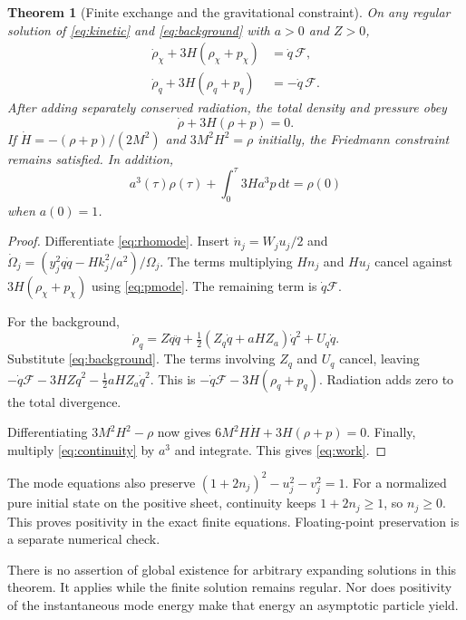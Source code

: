 \documentclass[11pt]{article}
\newtheorem{theorem}{Theorem}[section]\newtheorem{proposition}[theorem]{Proposition}\newtheorem{corollary}[theorem]{Corollary}
\theoremstyle{definition}\newtheorem{definition}[theorem]{Definition}
\newcommand{\dd}{\mathrm d}\newcommand{\Tr}{\mathcal T}\newcommand{\Ezero}{E_0}
\begin{document}
\begin{theorem}[Finite exchange and the gravitational constraint]\label{thm:flrw}
On any regular solution of \eqref{eq:kinetic} and \eqref{eq:background} with $a>0$ and $Z>0$,
\begin{align}
\dot\rho_\chi+3H(\rho_\chi+p_\chi)&=\dot q\,\mathcal F,\\
\dot\rho_q+3H(\rho_q+p_q)&=-\dot q\,\mathcal F.
\end{align}
After adding separately conserved radiation, the total density and pressure obey
\begin{equation}
\boxed{\dot\rho+3H(\rho+p)=0.}\label{eq:continuity}
\end{equation}
If $\dot H=-(\rho+p)/(2M^2)$ and $3M^2H^2=\rho$ initially, the Friedmann constraint remains satisfied. In addition,
\begin{equation}
\boxed{a^3(\tau)\rho(\tau)+\int_0^\tau3Ha^3p\,\dd t=\rho(0)}\label{eq:work}
\end{equation}
when $a(0)=1$.
\end{theorem}
\begin{proof}
Differentiate \eqref{eq:rhomode}. Insert $\dot n_j=W_ju_j/2$ and
$\dot\Omega_j=(y_j^2q\dot q-Hk_j^2/a^2)/\Omega_j$.
The terms multiplying $Hn_j$ and $Hu_j$ cancel against $3H(\rho_\chi+p_\chi)$ using \eqref{eq:pmode}. The remaining term is $\dot q\mathcal F$.

For the background,
\[
\dot\rho_q=Z\dot q\ddot q+\tfrac12(Z_q\dot q+aHZ_a)\dot q^2+U_q\dot q.
\]
Substitute \eqref{eq:background}. The terms involving $Z_q$ and $U_q$ cancel, leaving
$-\dot q\mathcal F-3HZ\dot q^2-\tfrac12aHZ_a\dot q^2$.
This is $-\dot q\mathcal F-3H(\rho_q+p_q)$. Radiation adds zero to the total divergence.

Differentiating $3M^2H^2-\rho$ now gives
$6M^2H\dot H+3H(\rho+p)=0$. Finally, multiply \eqref{eq:continuity} by $a^3$ and integrate. This gives \eqref{eq:work}.
\end{proof}

The mode equations also preserve
$(1+2n_j)^2-u_j^2-v_j^2=1$.
For a normalized pure initial state on the positive sheet, continuity keeps $1+2n_j\ge1$, so $n_j\ge0$. This proves positivity in the exact finite equations. Floating-point preservation is a separate numerical check.

There is no assertion of global existence for arbitrary expanding solutions in this theorem. It applies while the finite solution remains regular. Nor does positivity of the instantaneous mode energy make that energy an asymptotic particle yield.
\end{document}
